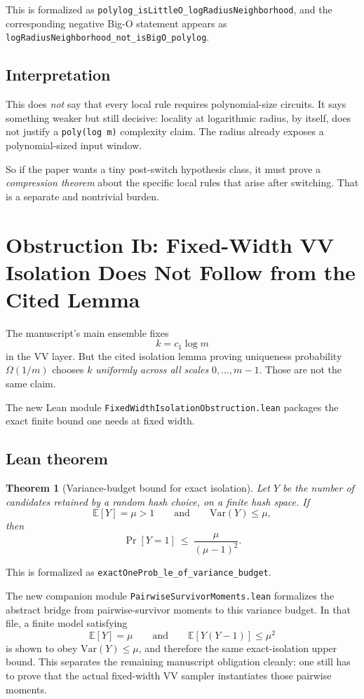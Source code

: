 \documentclass[11pt]{article}
\newtheorem{theorem}{Theorem}[section]
\theoremstyle{remark}
\begin{document}
\noindent
This is formalized as
\texttt{polylog\_isLittleO\_logRadiusNeighborhood}, and the corresponding negative
Big-O statement appears as
\texttt{logRadiusNeighborhood\_not\_isBigO\_polylog}.

\subsection{Interpretation}

This does \emph{not} say that every local rule requires polynomial-size circuits.
It says something weaker but still decisive: locality at logarithmic radius, by itself, does not
justify a \texttt{poly(log m)} complexity claim.  The radius already exposes a polynomial-sized
input window.

So if the paper wants a tiny post-switch hypothesis class, it must prove a \emph{compression
theorem} about the specific local rules that arise after switching.  That is a separate and
nontrivial burden.

\section{Obstruction Ib: Fixed-Width VV Isolation Does Not Follow from the Cited Lemma}

The manuscript's main ensemble fixes
\[
  k=c_1\log m
\]
in the VV layer.  But the cited isolation lemma proving uniqueness probability \(\Omega(1/m)\)
chooses \(k\) \emph{uniformly across all scales} \(0,\dots,m-1\).  Those are not the same claim.

The new Lean module \texttt{FixedWidthIsolationObstruction.lean} packages the exact finite bound
one needs at fixed width.

\subsection{Lean theorem}

\begin{theorem}[Variance-budget bound for exact isolation]
Let \(Y\) be the number of candidates retained by a random hash choice, on a finite hash space.
If
\[
  \mathbb E[Y]=\mu>1
  \qquad\text{and}\qquad
  \mathrm{Var}(Y)\le \mu,
\]
then
\[
  \Pr[Y=1]\ \le\ \frac{\mu}{(\mu-1)^2}.
\]
\end{theorem}

\noindent
This is formalized as
\texttt{exactOneProb\_le\_of\_variance\_budget}.

The new companion module \texttt{PairwiseSurvivorMoments.lean} formalizes the abstract bridge from
pairwise-survivor moments to this variance budget.  In that file, a finite model satisfying
\[
  \mathbb E[Y]=\mu
  \qquad\text{and}\qquad
  \mathbb E[Y(Y-1)]\le \mu^2
\]
is shown to obey \(\mathrm{Var}(Y)\le \mu\), and therefore the same exact-isolation upper bound.
This separates the remaining manuscript obligation cleanly: one still has to prove that the actual
fixed-width VV sampler instantiates those pairwise moments.
\end{document}

